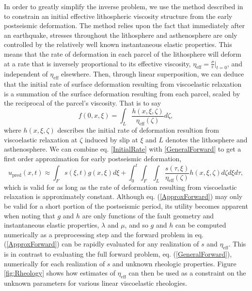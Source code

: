 \documentclass[1p]{elsarticle}
\begin{document}
In order to greatly simplify the inverse problem, we use the method described in \citet{Hines2015} to constrain an initial effective lithospheric viscosity structure from the early postseismic deformation.  The method relies upon the fact that immediately after an earthquake, stresses throughout the lithosphere and asthenosphere are only controlled by the relatively well known instantaneous elastic properties.  This means that the rate of deformation in each parcel of the lithosphere will deform at a rate that is inversely proportional to its effective viscosity, $\eta_{\mathrm{eff}}=\frac{\sigma}{\dot{\epsilon}}|_{t=0}$, and independent of $\eta_{\mathrm{eff}}$ elsewhere. Then, through linear superposition, we can deduce that the initial rate of surface deformation resulting from viscoelastic relaxation is a summation of the surface deformation resulting from each parcel, scaled by the reciprocal of the parcel's viscosity. That is to say   
\begin{equation}\label{InitialRate}
  f(0,x,\xi) = \int_L \frac{h(x,\xi,\zeta)}{\eta_\mathrm{eff}(\zeta)} d\zeta, 
\end{equation}
where $h(x,\xi,\zeta)$ describes the initial rate of deformation resultion from viscoelastic relaxation at $\zeta$ induced by slip at $\xi$ and $L$ denotes the lithosphere and asthenosphere. We can combine eq. \ref{InitialRate} with \ref{GeneralForward} to get a first order approximation for early postseismic deformation,
\begin{equation}\label{ApproxForward}
  u_\mathrm{pred}(x,t) \approx \int_F s(\xi,t)g(x,\xi)d\xi + 
           \int_0^t\int_F\int_L \frac{s(\tau,\xi)}{\eta_\mathrm{eff}(\zeta)} h(x,\xi,\zeta) d\zeta d\xi d\tau,
\end{equation}
which is valid for as long as the rate of deformation resulting from viscoelastic relaxation is approximately constant. Although eq. (\ref{ApproxForward}) may only be valid for a short portion of the postseismic period, its utility becomes apparent when noting that $g$ and $h$ are only functions of the fault geometry and instantaneous elastic properties, $\lambda$ and $\mu$, and so $g$ and $h$ can be computed numerically as a preprocessing step and the forward problem in eq. (\ref{ApproxForward}) can be rapidly evaluated for any realization of $s$ and $\eta_{\mathrm{eff}}$.  This is in contrast to evaluating the full forward problem, eq. (\ref{GeneralForward}), numerically for each realization of $s$ and unknown rheologic properties. Figure \ref{fig:Rheology} shows how estimates of $\eta_\mathrm{eff}$ can then be used as a constraint on the unknown parameters for various linear viscoelastic rheologies.    
\end{document}
